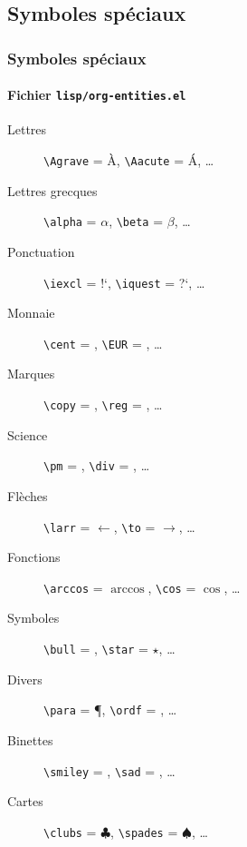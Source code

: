 \documentclass[presentation,t,hideothersubsections]{beamer}
\begin{document}
\subsection{Symboles spéciaux}
\label{sec-3-2}
\begin{frame}[fragile]
\frametitle{Symboles spéciaux}
\framesubtitle{Fichier \verb~lisp/org-entities.el~}
\label{sec-3-2-1}


\begin{description}
\item[Lettres] \texttt{\textbackslash{}Agrave} = \`{A}, \texttt{\textbackslash{}Aacute} = \'{A}, \ldots{}
\item[Lettres grecques] \texttt{\textbackslash{}alpha} = $\alpha$, \texttt{\textbackslash{}beta} = $\beta$, \ldots{}
\item[Ponctuation] \texttt{\textbackslash{}iexcl} = !`, \texttt{\textbackslash{}iquest} = ?`, \ldots{}
\item[Monnaie] \texttt{\textbackslash{}cent} = \textcent{}, \texttt{\textbackslash{}EUR} = \EUR{}, \ldots{}
\item[Marques] \texttt{\textbackslash{}copy} = \textcopyright{}, \texttt{\textbackslash{}reg} = \textregistered{}, \ldots{}
\item[Science] \texttt{\textbackslash{}pm} = \textpm{}, \texttt{\textbackslash{}div} = \textdiv{}, \ldots{}
\item[Flèches] \texttt{\textbackslash{}larr} = $\leftarrow$, \texttt{\textbackslash{}to} = $\to$, \ldots{}
\item[Fonctions] \texttt{\textbackslash{}arccos} = $\arccos$, \texttt{\textbackslash{}cos} = $\cos$, \ldots{}
\item[Symboles] \texttt{\textbackslash{}bull} = \textbullet{}, \texttt{\textbackslash{}star} = $\star$, \ldots{}
\item[Divers] \texttt{\textbackslash{}para} = \P{}, \texttt{\textbackslash{}ordf} = \textordfeminine{}, \ldots{}
\item[Binettes] \texttt{\textbackslash{}smiley} = \smiley{}, \texttt{\textbackslash{}sad} = \frownie{}, \ldots{}
\item[Cartes] \texttt{\textbackslash{}clubs} = $\clubsuit$, \texttt{\textbackslash{}spades} = $\spadesuit$, \ldots{}
\end{description}
\end{frame}
\end{document}
